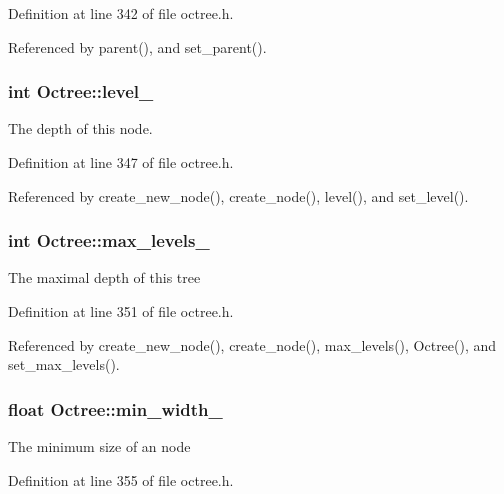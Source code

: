 Definition at line 342 of file octree.h.

Referenced by parent(), and set\_\-parent().\hypertarget{class_octree_3955482b438c39aef803253592306217}{
\subsubsection[level\_\-]{\setlength{\rightskip}{0pt plus 5cm}int {\bf Octree::level\_\-}}}
\label{class_octree_3955482b438c39aef803253592306217}


The depth of this node. 

Definition at line 347 of file octree.h.

Referenced by create\_\-new\_\-node(), create\_\-node(), level(), and set\_\-level().\hypertarget{class_octree_1b29e2ff7de0ce212008fc928de2e8c0}{
\subsubsection[max\_\-levels\_\-]{\setlength{\rightskip}{0pt plus 5cm}int {\bf Octree::max\_\-levels\_\-}}}
\label{class_octree_1b29e2ff7de0ce212008fc928de2e8c0}


The maximal depth of this tree 

Definition at line 351 of file octree.h.

Referenced by create\_\-new\_\-node(), create\_\-node(), max\_\-levels(), Octree(), and set\_\-max\_\-levels().\hypertarget{class_octree_d8300c6fe2f72671675b351e8b4e65db}{
\subsubsection[min\_\-width\_\-]{\setlength{\rightskip}{0pt plus 5cm}float {\bf Octree::min\_\-width\_\-}}}
\label{class_octree_d8300c6fe2f72671675b351e8b4e65db}


The minimum size of an node 

Definition at line 355 of file octree.h.

